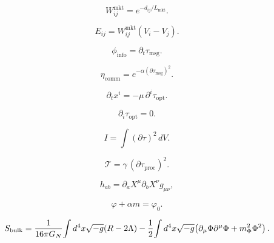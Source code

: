\[
W^{\mathrm{mkt}}_{ij} = e^{-d_{ij}/L_{\mathrm{mkt}}}.
\]

\[
E_{ij} = W^{\mathrm{mkt}}_{ij}(V_i - V_j).
\]

\[
\phi_{\mathrm{info}} = \partial_t \tau_{\mathrm{msg}}.
\]

\[
\eta_{\mathrm{comm}} = e^{-\alpha (\partial\tau_{\mathrm{msg}})^2}.
\]

\[
\partial_t x^i = -\mu\,\partial^i\tau_{\mathrm{opt}}.
\]

\[
\partial_i \tau_{\mathrm{opt}} = 0.
\]

\[
I = \int (\partial\tau)^2\, dV.
\]

\[
\mathcal{T} = \gamma\,(\partial\tau_{\mathrm{proc}})^2.
\]

\[
h_{ab} = \partial_a X^\mu \partial_b X^\nu g_{\mu\nu},
\]

\[
\varphi + \alpha m = \varphi_0.
\]

\[
S_{\rm bulk}
= \frac{1}{16\pi G_N}\!\int d^4x\sqrt{-g}(R - 2\Lambda)
- \frac{1}{2}\!\int d^4x\sqrt{-g}\!
\left(\partial_\mu\Phi \partial^\mu\Phi + m_\Phi^2\Phi^2\right).
\]


